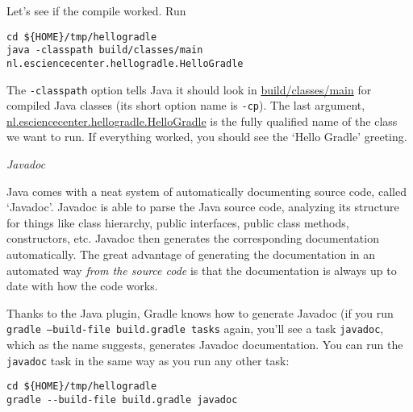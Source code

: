 Let's see if the compile worked. Run
\begin{lstlisting}[style=basic,style=bash]
cd ${HOME}/tmp/hellogradle
java -classpath build/classes/main nl.esciencecenter.hellogradle.HelloGradle
\end{lstlisting} %
The \texttt{-classpath} option tells Java it should look in \url{build/classes/main} for compiled Java classes (its short option name is \texttt{-cp}). The last argument, \url{nl.esciencecenter.hellogradle.HelloGradle} is the fully qualified name of the class we want to run. If everything worked, you should see the `Hello Gradle' greeting.

\vspace{2em}
\textit{Javadoc}

Java comes with a neat system of automatically documenting source code, called `Javadoc'. Javadoc is able to parse the Java source code, analyzing its structure for things like class hierarchy, public interfaces, public class methods, constructors, etc. Javadoc then generates the corresponding documentation automatically. The great advantage of generating the documentation in an automated way \textit{from the source code} is that the documentation is always up to date with how the code works.

Thanks to the Java plugin, Gradle knows how to generate Javadoc (if you run \texttt{gradle --build-file build.gradle tasks} again, you'll see a task \texttt{javadoc}, which as the name suggests, generates Javadoc documentation. You can run the \texttt{javadoc} task in the same way as you run any other task:
\begin{lstlisting}[style=basic,style=bash]
cd ${HOME}/tmp/hellogradle
gradle --build-file build.gradle javadoc
\end{lstlisting} %

